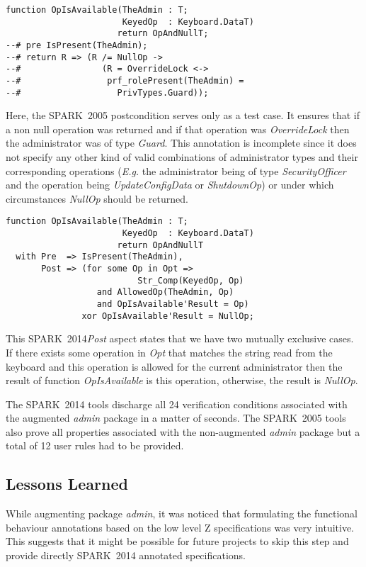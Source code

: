 \documentclass[10pt,a4paper,twocolumn]{article}
\newcommand{\oldspark}{SPARK~2005\xspace}
\newcommand{\newspark}{SPARK~2014\xspace}
\newcommand{\Eg}{\textit{E.g.}\xspace}
\begin{document}
\begin{lstlisting}[caption=\oldspark]
function OpIsAvailable(TheAdmin : T;
                       KeyedOp  : Keyboard.DataT)
                      return OpAndNullT;
--# pre IsPresent(TheAdmin);
--# return R => (R /= NullOp ->
--#                (R = OverrideLock <->
--#                 prf_rolePresent(TheAdmin) =
--#                   PrivTypes.Guard));
\end{lstlisting}
Here, the \oldspark postcondition serves only as a test case. It
ensures that if a non null operation was returned and if that
operation was \emph{OverrideLock} then the administrator was of type
\emph{Guard}. This annotation is incomplete since it does not specify
any other kind of valid combinations of administrator types and their
corresponding operations (\Eg the administrator being of type
\emph{SecurityOfficer} and the operation being \emph{UpdateConfigData}
or \emph{ShutdownOp}) or under which circumstances \emph{NullOp}
should be returned.

\begin{lstlisting}[caption=\newspark]
function OpIsAvailable(TheAdmin : T;
                       KeyedOp  : Keyboard.DataT)
                      return OpAndNullT
  with Pre  => IsPresent(TheAdmin),
       Post => (for some Op in Opt =>
                          Str_Comp(KeyedOp, Op)
                  and AllowedOp(TheAdmin, Op)
                  and OpIsAvailable'Result = Op)
               xor OpIsAvailable'Result = NullOp;
\end{lstlisting}
This \newspark \emph{Post} aspect states that we have two mutually
exclusive cases. If there exists some operation in \emph{Opt} that
matches the string read from the keyboard and this operation is
allowed for the current administrator then the result of function
\emph{OpIsAvailable} is this operation, otherwise, the result is
\emph{NullOp}.

The \newspark tools discharge all 24 verification conditions
associated with the augmented \emph{admin} package in a matter of
seconds. The \oldspark tools also prove all properties associated with
the non-augmented \emph{admin} package but a total of 12 user rules had
to be provided.

\subsection{Lessons Learned}

While augmenting package \emph{admin}, it was noticed that formulating
the functional behaviour annotations based on the low level Z
specifications was very intuitive. This suggests that it might be
possible for future projects to skip this step and provide directly
\newspark annotated specifications.
\end{document}
